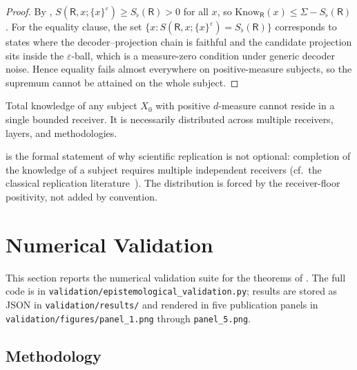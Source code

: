 \documentclass[twocolumn,11pt,a4paper]{article}
\newcommand{\receiver}{\mathsf{R}}
\newcommand{\Sfloor}{S_{\flat}}
\newcommand{\eps}{\varepsilon}
\begin{document}
\begin{proof}
By , $S(\receiver,x;\{x\}^{\eps})\ge\Sfloor(\receiver)>0$
for all $x$, so $\mathrm{Know}_{\receiver}(x)\le\Sigma-\Sfloor(\receiver)$.
For the equality clause, the set
$\{x:S(\receiver,x;\{x\}^{\eps})=\Sfloor(\receiver)\}$ corresponds to
states where the decoder--projection chain is faithful and the candidate
projection sits inside the $\eps$-ball, which is a measure-zero condition
under generic decoder noise. Hence equality fails almost everywhere on
positive-measure subjects, so the supremum cannot be attained on the
whole subject.
\end{proof}

\begin{corollary}\label{cor:anti-mon}
Total knowledge of any subject $X_0$ with positive $d$-measure cannot
reside in a single bounded receiver. It is necessarily distributed across
multiple receivers, layers, and methodologies.
\end{corollary}

\begin{remark}\label{rem:replication-need}
 is the formal statement of why scientific
replication is not optional: completion of the knowledge of a subject
requires multiple independent receivers (cf.\ the classical replication
literature~\cite{lehmann2006,wasserman2004}). The distribution is forced
by the receiver-floor positivity, not added by convention.
\end{remark}

\section{Numerical Validation}
\label{sec:validation}

This section reports the numerical validation suite for the theorems of
.
The full code is in
\texttt{validation/epistemological\_validation.py}; results are stored as
JSON in \texttt{validation/results/} and rendered in five publication
panels in \texttt{validation/figures/panel\_1.png} through
\texttt{panel\_5.png}.

\subsection{Methodology}
\end{document}
